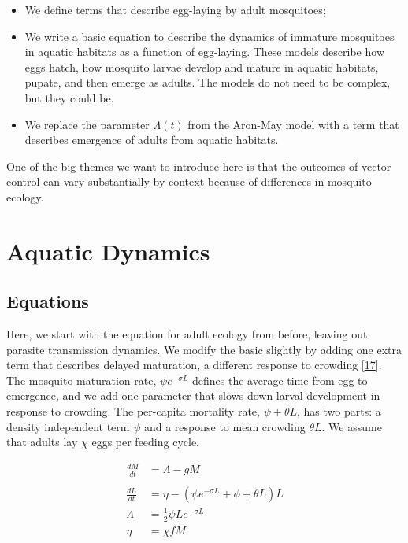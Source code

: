 \documentclass[
]{book}
\begin{document}
\begin{itemize}
\item
  We define terms that describe egg-laying by adult mosquitoes;
\item
  We write a basic equation to describe the dynamics of immature mosquitoes in aquatic habitats as a function of egg-laying. These models describe how eggs hatch, how mosquito larvae develop and mature in aquatic habitats, pupate, and then emerge as adults. The models do not need to be complex, but they could be.
\item
  We replace the parameter \(\Lambda(t)\) from the Aron-May model with a term that
  describes emergence of adults from aquatic habitats.
\end{itemize}

One of the big themes we want to introduce here is that the outcomes of vector control can vary substantially by context because of differences in mosquito ecology.

\hypertarget{aquatic-dynamics}{%
\section{Aquatic Dynamics}\label{aquatic-dynamics}}

\hypertarget{equations}{%
\subsection{Equations}\label{equations}}

Here, we start with the equation for adult ecology from before, leaving out parasite transmission dynamics. We modify the basic slightly by adding one extra term that describes delayed maturation, a different response to crowding {[}\protect\hyperlink{ref-SmithDL2013_LarvalDynamics}{17}{]}. The mosquito maturation rate, \(\psi e^{-\sigma L}\) defines the average time from egg to emergence, and we add one parameter that slows down larval development in response to crowding. The per-capita mortality rate, \(\psi + \theta L\), has two parts: a density independent term \(\psi\) and a response to mean crowding \(\theta L\). We assume that adults lay \(\chi\) eggs per feeding cycle.

\begin{equation}
\begin{array}{rl}
\frac{dM}{dt} &= \Lambda - g M\\  \\ \hline 
\frac{dL}{dt} &= \eta - (\psi e^{-\sigma L} + \phi + \theta L) L \\ 
\Lambda &= \frac{1}{2} \psi L e^{-\sigma L}\\ 
\eta &= \chi f M \\ 
\end{array}
\end{equation}
\end{document}
